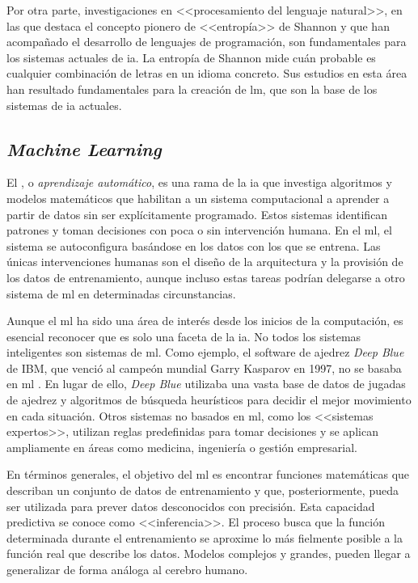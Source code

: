 
Por otra parte, investigaciones en <<procesamiento del lenguaje natural>>, en las que destaca el concepto pionero de <<entropía>> de Shannon \citep{shannon1951prediction} y que han acompañado el desarrollo de lenguajes de programación, son fundamentales para los sistemas actuales de \gls{ia}. La entropía de Shannon mide cuán probable es cualquier combinación de letras en un idioma concreto. Sus estudios en esta área han resultado fundamentales para la creación de \gls{lm}, que son la base de los sistemas de \gls{ia} actuales.


\subsection{\emph{Machine Learning}}

El  , o \emph{aprendizaje automático}, es una rama de la \gls{ia} que investiga algoritmos y modelos matemáticos que habilitan a un sistema computacional a aprender a partir de datos sin ser explícitamente programado. Estos sistemas identifican patrones y toman decisiones con poca o sin intervención humana. En el \gls{ml}, el sistema se autoconfigura basándose en los datos con los que se entrena. Las únicas intervenciones humanas son el diseño de la arquitectura y la provisión de los datos de entrenamiento, aunque incluso estas tareas podrían delegarse a otro sistema de \gls{ml} en determinadas circunstancias.

Aunque el \gls{ml} ha sido una área de interés desde los inicios de la computación, es esencial reconocer que es solo una faceta de la \gls{ia}. No todos los sistemas inteligentes son sistemas de \gls{ml}. Como ejemplo, el software de ajedrez \emph{Deep Blue} de IBM, que venció al campeón mundial Garry Kasparov en 1997, no se basaba en \gls{ml} \citep{campbellDeepBlue2002}. En lugar de ello, \emph{Deep Blue} utilizaba una vasta base de datos de jugadas de ajedrez y algoritmos de búsqueda heurísticos para decidir el mejor movimiento en cada situación. Otros sistemas no basados en \gls{ml}, como los <<sistemas expertos>>, utilizan reglas predefinidas para tomar decisiones y se aplican ampliamente en áreas como medicina, ingeniería o gestión empresarial.

En términos generales, el objetivo del \gls{ml} es encontrar funciones matemáticas que describan un conjunto de datos de entrenamiento y que, posteriormente, pueda ser utilizada para prever datos desconocidos con precisión. Esta capacidad predictiva se conoce como <<inferencia>>. El proceso busca que la función determinada durante el entrenamiento se aproxime lo más fielmente posible a la función real que describe los datos. Modelos complejos y grandes, pueden llegar a generalizar de forma análoga al cerebro humano. 


